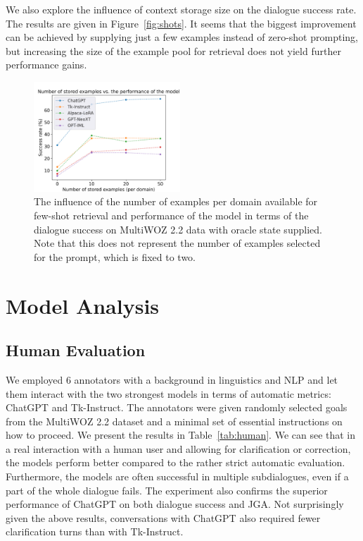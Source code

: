 We also explore the influence of context storage size on the dialogue success rate.
The results are given in Figure~\ref{fig:shots}.
It seems that the biggest improvement can be achieved by supplying just a few examples instead of zero-shot prompting, but increasing the size of the example pool for retrieval does not yield further performance gains.
\begin{figure}[h]
    \centering
    \includegraphics[width=0.49\textwidth]{images/shots.png}
    \caption{The influence of the number of examples per domain available for few-shot retrieval and performance of the model in terms of the dialogue success on MultiWOZ 2.2 data with oracle state supplied. Note that this does not represent the number of examples selected for the prompt, which is fixed to two.}
    \label{07:fig:shots}
\end{figure}

\section{Model Analysis}
\label{sec:analysis}


\subsection{Human Evaluation}

We employed 6 annotators with a background in linguistics and NLP and let them interact with the two strongest models in terms of automatic metrics: ChatGPT and Tk-Instruct.
The annotators were given randomly selected goals from the MultiWOZ 2.2 dataset and a minimal set of essential instructions on how to proceed.
We present the results in Table~\ref{tab:human}.
We can see that in a real interaction with a human user and allowing for clarification or correction, the models perform better compared to the rather strict automatic evaluation.
Furthermore, the models are often successful in multiple subdialogues, even if a part of the whole dialogue fails.
The experiment also confirms the superior performance of ChatGPT on both dialogue success and JGA.
Not surprisingly given the above results, conversations with ChatGPT also required fewer clarification turns than with Tk-Instruct.

